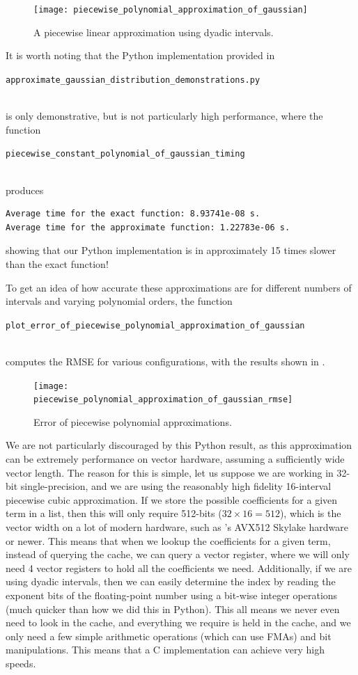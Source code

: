 \documentclass[11pt,a4paper,oneside,english]{extarticle}
\newcommand{\singlecodeline}[1]{\\[1em]\centerline{\lstinline[basicstyle=\ttfamily]$#1$}\\[1em]}
\begin{document}
\begin{figure}[htb]
\centering
\texttt{[image: piecewise\_polynomial\_approximation\_of\_gaussian]}
\caption{A piecewise linear approximation using dyadic intervals.}
\label{fig:piecewise_polynomial_approximation_of_gaussian}
\end{figure}

It is worth noting that the Python implementation provided in 
\singlecodeline{approximate_gaussian_distribution_demonstrations.py}
is only demonstrative, but is not particularly high performance, where the function \singlecodeline{piecewise_constant_polynomial_of_gaussian_timing}
produces
\begin{verbatim}
Average time for the exact function: 8.93741e-08 s.
Average time for the approximate function: 1.22783e-06 s.
\end{verbatim}
showing that our Python implementation is in approximately 15 times slower than the exact function! 

To get an idea of how accurate these approximations are for different numbers of intervals and varying polynomial orders, the function \singlecodeline{plot_error_of_piecewise_polynomial_approximation_of_gaussian} computes the RMSE for various configurations, with the results shown in .

\begin{figure}[htb]
\centering
\texttt{[image: piecewise\_polynomial\_approximation\_of\_gaussian\_rmse]}
\caption{Error of piecewise polynomial approximations.}
\label{fig:piecewise_polynomial_approximation_of_gaussian_rmse}
\end{figure}

We are not particularly discouraged by this Python result, as this approximation can be extremely performance on vector hardware, assuming a sufficiently wide vector length. The reason for this is simple, let us suppose we are working in 32-bit single-precision, and we are using the reasonably high fidelity 16-interval piecewise cubic approximation. If we store the possible coefficients for a given term in a list, then this will only require 512-bits ($ 32 \times 16 = 512 $), which is the vector width on a lot of modern hardware, such as \intel's AVX512 Skylake hardware or newer. This means that when we lookup the coefficients for a given term, instead of querying the cache, we can query a vector register, where we will only need 4 vector registers to hold all the coefficients we need. Additionally, if we are using dyadic intervals, then we can easily determine the index by reading the exponent bits of the floating-point number using a bit-wise integer operations (much quicker than how we did this in Python). This all means we never even need to look in the cache, and everything we require is held in the cache, and we only need a few simple arithmetic operations (which can use FMAs) and bit manipulations. This means that a C implementation can achieve very high speeds.
\end{document}
